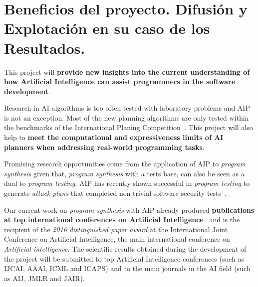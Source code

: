 \documentclass[10pt,a4paper]{paper}
\begin{document}
\section{Beneficios del proyecto. Difusión y Explotación en su caso de los Resultados.}
\label{subsec:beneficios}
This project will {\bf provide new insights into the current understanding of how Artificial Intelligence can assist programmers in the software development}.

Research in AI algorithms is too often tested with laboratory problems and AIP is not an exception. Most of the new planning algorithms are only tested within the benchmarks of the International Planing Competition~\cite{vallati:IPC:AI15}. This project will also help to {\bf meet the computational and expressiveness limits of AI planners when addressing real-world programming tasks}.

Promising research opportunities come from the application of AIP to {\em program synthesis} given that, {\em program synthesis} with a tests base, can also be seen as a dual to {\em program testing}. AIP has recently shown successful in {\em program testing} to generate {\em attack plans} that completed non-trivial software security tests~\cite{hoffmann2015simulated,steinmetz2016revisiting,shmaryahu2016constructing,steinmetz2016goal}.

Our current work on {\em program synthesis} with AIP already produced {\bf publications at top international conferences on Artificial Intelligence}~\cite{segovia2017generating,sergio:aprogramingb:ijcai16,sergio:aprograming:ijcai16,sergio:aprograming:icaps16} and is the recipient of the {\it 2016 distinguished paper award} at the International Joint Conference on Artificial Intelligence, the main international conference on {\em Artificial intelligence}. The scientific results obtained during the development of the project will be submitted to top Artificial Intelligence conferences (such as IJCAI, AAAI, ICML and ICAPS) and to the main journals in the AI field (such as AIJ, JMLR and JAIR).

\begin{footnotesize}

\end{footnotesize}

\end{document}
